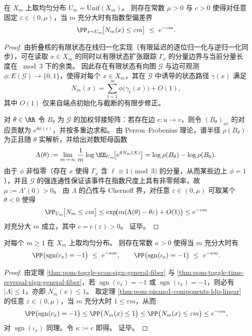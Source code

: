 \begin{theorem}\label{thm:pom-pisano1-components-ldp-linear}
在 \(X_m\) 上取均匀分布 \(U_m=\mathrm{Unif}(X_m)\)。
则存在常数 \(\mu>0\) 与 \(c>0\) 使得对任意固定 \(\varepsilon\in(0,\mu)\)，当 \(m\) 充分大时有指数型偏差界
\[
\PP_{x\sim U_m}\!\bigl[N_m(x)\le \varepsilon m\bigr]\ \le\ e^{-c m}.
\]
\end{theorem}
\begin{proof}
由折叠核的有限状态在线归一化实现（有限延迟的逐位归一化与逆归一化同步），可在读取 \(x\in X_m\) 的同时以有限状态扩张跟踪 \(\Gamma_x\) 的分量边界与当前分量长度在 \(\bmod 3\) 下的余类。
因此存在有限状态有向图 \(\mathcal G\) 与边可观测 \(\phi:E(\mathcal G)\to\{0,1\}\)，使得对每个 \(x\in X_m\)，其在 \(\mathcal G\) 中诱导的状态路径 \(\gamma(x)\) 满足
\[
N_m(x)=\sum_{t=1}^{m} \phi\bigl(\gamma_t(x)\bigr)+O(1),
\]
其中 \(O(1)\) 仅来自端点初始化与截断的有限步修正。
\par
对 \(\theta\in\RR\) 令 \(B_\theta\) 为 \(\mathcal G\) 的加权邻接矩阵：若存在边 \(e:u\to v\)，则令 \((B_\theta)_{uv}\) 的对应贡献为 \(e^{\theta\phi(e)}\)，并按多重边求和。
由 Perron--Frobenius 理论，谱半径 \(\rho(B_\theta)\) 为正且随 \(\theta\) 实解析，并给出对数矩母函数
\[
\Lambda(\theta):=\lim_{m\to\infty}\frac{1}{m}\log \EE_{U_m}\!\bigl[e^{\theta N_m(X)}\bigr]
=\log\rho(B_\theta)-\log\rho(B_0).
\]
由于 \(\phi\) 非恒零（存在 \(x\) 使得 \(\Gamma_x\) 含 \(\ell\equiv 1\pmod 3\) 的分量，从而某些边上 \(\phi=1\)），并且 \(\mathcal G\) 的强连通性保证该事件在指数尺度上具有非零频率，故 \(\mu:=\Lambda'(0)>0\)。
由 \(\Lambda\) 的凸性与 Chernoff 界，对任意 \(\varepsilon\in(0,\mu)\) 可取某个 \(\theta<0\) 使得
\[
\PP_{U_m}\!\bigl[N_m\le \varepsilon m\bigr]\le
\exp\!\bigl(m(\Lambda(\theta)-\theta\varepsilon)+O(1)\bigr)
\le e^{-cm}
\]
对充分大 \(m\) 成立，其中 \(c=c(\varepsilon)>0\)。
证毕。
\end{proof}

\begin{theorem}[奇置换扇区的指数稀薄性]\label{thm:pom-toggle-odd-sector-exponential-thinness}
对每个 \(m\ge 1\) 在 \(X_m\) 上取均匀分布。
则存在常数 \(\kappa>0\) 使得当 \(m\) 充分大时有
\[
\PP\bigl(\operatorname{sgn}(c_x)=-1\bigr)\ \le\ e^{-\kappa m},
\qquad
\PP\bigl(\operatorname{sgn}(\iota_x)=-1\bigr)\ \le\ e^{-\kappa m}.
\]
\end{theorem}
\begin{proof}
由定理 \ref{thm:pom-toggle-scan-sign-general-fiber} 与 \ref{thm:pom-toggle-time-reversal-sign-general-fiber}，若 \(\operatorname{sgn}(c_x)=-1\) 或 \(\operatorname{sgn}(\iota_x)=-1\)，则必有 \(|A|\le 1\)，亦即 \(N_m(x)\le 1\)。
取定理 \ref{thm:pom-pisano1-components-ldp-linear} 的任意 \(\varepsilon\in(0,\mu)\)，当 \(m\) 充分大时 \(1\le \varepsilon m\)，从而
\[
\PP\bigl(\operatorname{sgn}(c_x)=-1\bigr)\le \PP\bigl(N_m(x)\le 1\bigr)\le \PP\bigl(N_m(x)\le \varepsilon m\bigr)\le e^{-cm},
\]
对 \(\operatorname{sgn}(\iota_x)\) 同理。令 \(\kappa:=c\) 即得。
证毕。
\end{proof}

